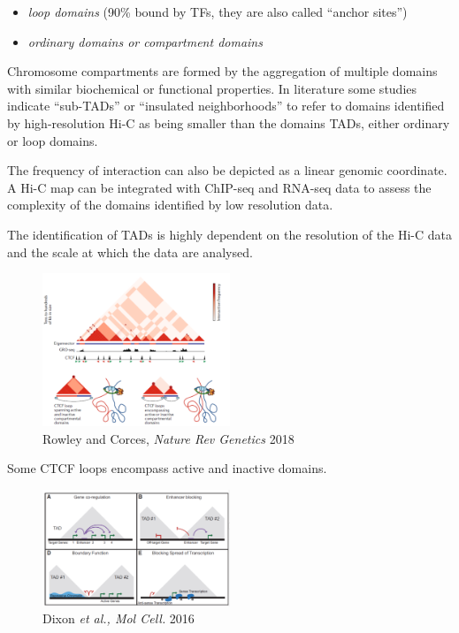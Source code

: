 \begin{itemize}
\tightlist
\item
  \emph{loop domains} (90\% bound by TFs, they are also called ``anchor sites'')
\item
  \emph{ordinary domains or compartment domains}
\end{itemize}

Chromosome compartments are formed by the aggregation of multiple domains with similar biochemical or functional properties. In literature some studies indicate ``sub-TADs'' or ``insulated neighborhoods'' to refer to domains identified by high-resolution Hi-C as being smaller than the domains TADs, either ordinary or loop domains.

The frequency of interaction can also be depicted as a linear genomic coordinate. A Hi-C map can be integrated with ChIP-seq and RNA-seq data to assess the complexity of the domains identified by low resolution data.

The identification of TADs is highly dependent on the resolution of the Hi-C data and the scale at which the data are analysed.

\begin{figure}
\centering
\includegraphics[width=0.5\textwidth]{../_resources/Screenshot_2022-10-19_at_09-20-57.png}
\caption{Rowley and Corces, \emph{Nature Rev Genetics} 2018}
\end{figure}

Some CTCF loops encompass active and inactive domains.

\begin{figure}
\centering
\includegraphics[width=0.5\textwidth]{../_resources/Screenshot_2022-10-19_at_09-21-57.png}
\caption{Dixon \emph{et al., Mol Cell.} 2016}
\end{figure}


